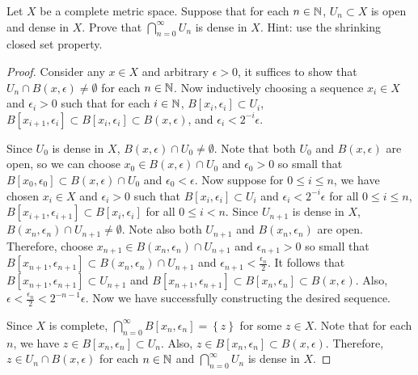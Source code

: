 \documentclass[a4paper]{article}
\begin{document}
\begin{thm}
Let $X$ be a complete metric space.  Suppose that for each 
$n \in \mathbb{N}$, $U_n \subset X$ is open and dense in $X$. 
Prove that $\bigcap_{n=0}^\infty U_n$ is dense in $X$.  
Hint: use the shrinking closed set property.
\end{thm}

\begin{proof}
  Consider any $x \in X$ and arbitrary $\epsilon > 0$, it
  suffices to show that $U_n \cap B(x, \epsilon)
  \neq \emptyset$ for each $n \in \mathbb{N}$. 
  Now inductively choosing a sequence 
  $x_i \in X$ and $\epsilon_i > 0$ such that 
  for each $i \in \mathbb{N}$, $B[x_i, \epsilon_i] \subset U_i$,
  $B[x_{i+1}, \epsilon_i] \subset B[x_i, \epsilon_i]
  \subset B(x, \epsilon)$, and $\epsilon_i < 2^{-i} \epsilon$.
  
  Since $U_0$ is dense in $X$,
  $B(x, \epsilon) \cap U_0 \neq \emptyset$.
  Note that both $U_0$ and $B(x, \epsilon)$ are open, so
  we can choose $x_0 \in B(x, \epsilon) \cap U_0$ 
  and $\epsilon_0 > 0$ so small 
  that $B[x_0, \epsilon_0] \subset B(x, \epsilon) \cap U_0$
  and $\epsilon_0 < \epsilon$. 
  Now suppose 
  for $0 \leq i \leq n$, we have chosen $x_i \in X$ 
  and $\epsilon_i > 0$ such that 
  $B[x_i, \epsilon_i] \subset U_i$ 
  and $\epsilon_i < 2^{-i} \epsilon$ 
  for all $0 \leq i \leq n$,
  $B[x_{i+1}, \epsilon_{i+1}] \subset 
  B[x_i, \epsilon_i]$ for all $0 \leq i < n$.
  Since $U_{n+1}$ is dense in $X$, $B(x_n, \epsilon_n)
  \cap U_{n+1} \neq \emptyset$. Note also both $U_{n+1}$ 
  and $B(x_n, \epsilon_n)$ are open.
  Therefore, choose 
  $x_{n+1} \in B(x_n, \epsilon_n) \cap U_{n+1}$ and 
  $\epsilon_{n+1} > 0$ so small that 
  $B[x_{n+1}, \epsilon_{n+1}] \subset B(x_n, \epsilon_n) 
  \cap U_{n+1}$ and $\epsilon_{n+1} < \frac{\epsilon_n}{2}$. 
  It follows that 
  $B[x_{n+1}, \epsilon_{n+1}] \subset U_{n+1}$ and 
  $B[x_{n+1}, \epsilon_{n+1}] \subset B[x_n, \epsilon_n]
  \subset B(x, \epsilon)$. Also, 
  $\epsilon < \frac{\epsilon_n}{2} < 2^{-n-1} \epsilon$.
  Now we have successfully constructing the desired sequence.
  
  Since $X$ is complete, $\bigcap_{n=0}^\infty B[x_n, \epsilon_n]
  = \left\{ z \right\}$ for some $z \in X$. Note that 
  for each $n$, we have $z \in B[x_n, \epsilon_n] \subset U_n$. 
  Also,
  $z \in B[x_n, \epsilon_n] \subset B(x, \epsilon)$. 
  Therefore, $z \in U_n \cap B(x, \epsilon)$ for each $n \in \mathbb{N}$
  and $\bigcap_{n=0}^\infty U_n$ is dense in $X$.

\end{proof}
\end{document}
